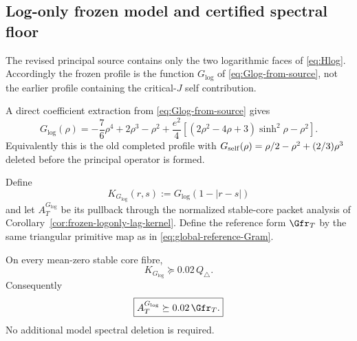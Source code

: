 \subsection{Log-only frozen model and certified spectral floor}
\label{sec:logonly-model-floor}

The revised principal source contains only the two logarithmic faces of
\eqref{eq:Hlog}.  Accordingly the frozen profile is the function
$G_{\log}$ of \eqref{eq:Glog-from-source}, not the earlier profile containing
the critical-$J$ self contribution.

A direct coefficient extraction from \eqref{eq:Glog-from-source} gives
\begin{equation}
\boxed{
G_{\log}(\rho)
=-\frac76\rho^4+2\rho^3-\rho^2
+\frac{e^2}{4}\left[
(2\rho^2-4\rho+3)\sinh^2\rho-\rho^2
\right].
}
\label{eq:Glog-closed}
\end{equation}
Equivalently this is the old completed profile with
$G_{\rm self}(\rho)=\rho/2-\rho^2+(2/3)\rho^3$ deleted before the principal
operator is formed.

Define
\[
K_{G_{\log}}(r,s):=G_{\log}(1-|r-s|)
\]
and let $A_T^{G_{\log}}$ be its pullback through the normalized stable-core
packet analysis of Corollary~\ref{cor:frozen-logonly-lag-kernel}.  Define the
reference form $\Gfr_T$ by the same triangular primitive map as in
\eqref{eq:global-reference-Gram}.

\begin{proposition}
\label{prop:logonly-model-floor}
On every mean-zero stable core fibre,
\begin{equation}
\boxed{
K_{G_{\log}}\succeq0.02\,Q_\triangle.
}
\label{eq:logonly-model-floor-fibre}
\end{equation}
Consequently
\begin{equation}
\boxed{
A_T^{G_{\log}}\succeq0.02\,\Gfr_T.
}
\label{eq:logonly-model-floor}
\end{equation}
No additional model spectral deletion is required.
\end{proposition}

